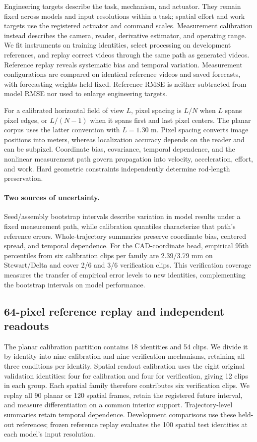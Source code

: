 \documentclass[10pt,twocolumn,letterpaper]{article}
\begin{document}
Engineering targets describe the task, mechanism, and actuator. They remain fixed across models and input resolutions within a task; spatial effort and work targets use the registered actuator and command scales. Measurement calibration instead describes the camera, reader, derivative estimator, and operating range. We fit instruments on training identities, select processing on development references, and replay correct videos through the same path as generated videos. Reference replay reveals systematic bias and temporal variation. Measurement configurations are compared on identical reference videos and saved forecasts, with forecasting weights held fixed. Reference RMSE is neither subtracted from model RMSE nor used to enlarge engineering targets.

For a calibrated horizontal field of view $L$, pixel spacing is $L/N$ when $L$ spans pixel edges, or $L/(N-1)$ when it spans first and last pixel centers. The planar corpus uses the latter convention with $L=1.30$ m. Pixel spacing converts image positions into meters, whereas localization accuracy depends on the reader and can be subpixel. Coordinate bias, covariance, temporal dependence, and the nonlinear measurement path govern propagation into velocity, acceleration, effort, and work. Hard geometric constraints independently determine rod-length preservation.

\paragraph{Two sources of uncertainty.}
Seed/assembly bootstrap intervals describe variation in model results under a fixed measurement path, while calibration quantiles characterize that path's reference errors. Whole-trajectory summaries preserve coordinate bias, centered spread, and temporal dependence. For the CAD-coordinate head, empirical 95th percentiles from six calibration clips per family are 2.39/3.79 mm on Stewart/Delta and cover 2/6 and 3/6 verification clips. This verification coverage measures the transfer of empirical error levels to new identities, complementing the bootstrap intervals on model performance.

\subsection{64-pixel reference replay and independent readouts}
The planar calibration partition contains 18 identities and 54 clips. We divide it by identity into nine calibration and nine verification mechanisms, retaining all three conditions per identity. Spatial readout calibration uses the eight original validation identities: four for calibration and four for verification, giving 12 clips in each group. Each spatial family therefore contributes six verification clips. We replay all 90 planar or 120 spatial frames, retain the registered future interval, and measure differentiation on a common interior support. Trajectory-level summaries retain temporal dependence. Development comparisons use these held-out references; frozen reference replay evaluates the 100 spatial test identities at each model's input resolution.
\end{document}
